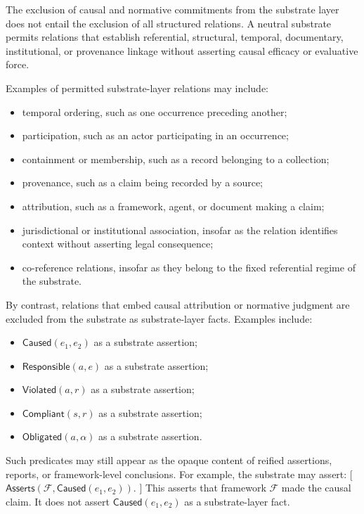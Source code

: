 The exclusion of causal and normative commitments from the substrate layer
does not entail the exclusion of all structured relations.
A neutral substrate permits relations that establish
referential, structural, temporal, documentary,
institutional, or provenance linkage
without asserting causal efficacy or evaluative force.

Examples of permitted substrate-layer relations may include:
\begin{itemize}
  \item temporal ordering, such as one occurrence preceding another;
  \item participation, such as an actor participating in an occurrence;
  \item containment or membership, such as a record belonging to a collection;
  \item provenance, such as a claim being recorded by a source;
  \item attribution, such as a framework, agent, or document making a claim;
  \item jurisdictional or institutional association,
        insofar as the relation identifies context
        without asserting legal consequence;
  \item co-reference relations, insofar as they belong
        to the fixed referential regime of the substrate.
\end{itemize}

By contrast, relations that embed causal attribution
or normative judgment are excluded from the substrate
as substrate-layer facts.
Examples include:
\begin{itemize}
  \item $\mathsf{Caused}(e_1,e_2)$ as a substrate assertion;
  \item $\mathsf{Responsible}(a,e)$ as a substrate assertion;
  \item $\mathsf{Violated}(a,r)$ as a substrate assertion;
  \item $\mathsf{Compliant}(s,r)$ as a substrate assertion;
  \item $\mathsf{Obligated}(a,\alpha)$ as a substrate assertion.
\end{itemize}

Such predicates may still appear as the opaque content
of reified assertions, reports, or framework-level conclusions.
For example, the substrate may assert:
[
$\mathsf{Asserts}(\mathcal{F}, \mathsf{Caused}(e_1,e_2))$.
]
This asserts that framework $\mathcal{F}$ made the causal claim.
It does not assert
$\mathsf{Caused}(e_1,e_2)$
as a substrate-layer fact.

